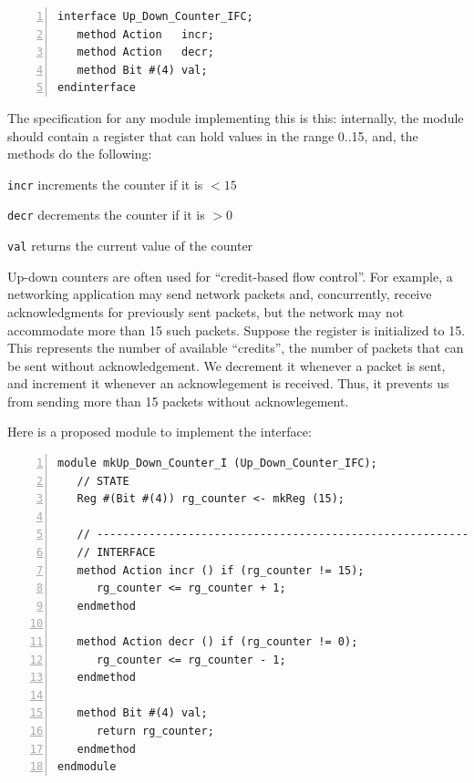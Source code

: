 {\footnotesize
\begin{Verbatim}[frame=single, numbers=left]
interface Up_Down_Counter_IFC;
   method Action   incr;
   method Action   decr;
   method Bit #(4) val;
endinterface
\end{Verbatim}
}

The specification for any module implementing this is this:
internally, the module should contain a register that can hold values
in the range 0..15, and, the methods do the following:

\begin{tightlist}
 \item \verb|incr|  increments the counter if it is $< 15$
 \item \verb|decr|  decrements the counter if it is $> 0$
 \item \verb|val|   returns the current value of the counter
\end{tightlist}

Up-down counters are often used for ``credit-based flow control''.
For example, a networking application may send network packets and,
concurrently, receive acknowledgments for previously sent packets, but
the network may not accommodate more than 15 such packets.  Suppose
the register is initialized to 15.  This represents the number of
available ``credits'', {\ie} the number of packets that can be sent
without acknowledgement.  We decrement it whenever a packet is sent,
and increment it whenever an acknowlegement is received.  Thus, it
prevents us from sending more than 15 packets without acknowlegement.

Here is a proposed module to implement the interface:

{\footnotesize
\begin{Verbatim}[frame=single, numbers=left]
module mkUp_Down_Counter_I (Up_Down_Counter_IFC);
   // STATE
   Reg #(Bit #(4)) rg_counter <- mkReg (15);

   // ----------------------------------------------------------------
   // INTERFACE
   method Action incr () if (rg_counter != 15);
      rg_counter <= rg_counter + 1;
   endmethod

   method Action decr () if (rg_counter != 0);
      rg_counter <= rg_counter - 1;
   endmethod

   method Bit #(4) val;
      return rg_counter;
   endmethod
endmodule
\end{Verbatim}
}


